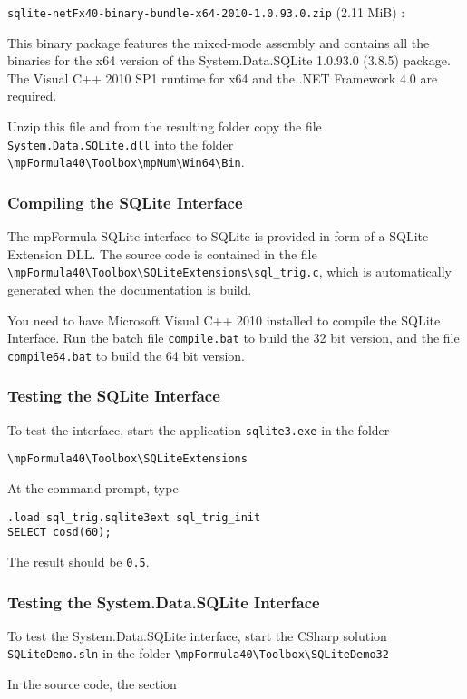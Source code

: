 \vpara
\verb|sqlite-netFx40-binary-bundle-x64-2010-1.0.93.0.zip| (2.11 MiB) : 

\vpara
This binary package features the mixed-mode assembly and contains all the binaries for the x64 version of the System.Data.SQLite 1.0.93.0 (3.8.5) package. The Visual C++ 2010 SP1 runtime for x64 and the .NET Framework 4.0 are required.

\vpara
Unzip this file and from the resulting folder copy the file \verb|System.Data.SQLite.dll|  into the folder \verb|\mpFormula40\Toolbox\mpNum\Win64\Bin|. 


\subsubsection{Compiling the SQLite Interface}

The mpFormula SQLite interface to SQLite is provided in form of a SQLite Extension DLL. The source code is contained in the file \verb|\mpFormula40\Toolbox\SQLiteExtensions\sql_trig.c|, which is automatically generated when the documentation is build.

You need to have Microsoft Visual C++ 2010 installed to compile the SQLite Interface. Run the batch file \verb|compile.bat| to build the 32 bit version, and the file  \verb|compile64.bat| to build the 64 bit version.


\subsubsection{Testing the SQLite Interface}

To test the interface, start the application \verb|sqlite3.exe| in the folder

\verb|\mpFormula40\Toolbox\SQLiteExtensions|

\vpara
At the command prompt, type
\begin{verbatim}
.load sql_trig.sqlite3ext sql_trig_init
SELECT cosd(60);
\end{verbatim}
The result should be \verb|0.5|.


\subsubsection{Testing the System.Data.SQLite Interface}

To test the System.Data.SQLite interface, start the CSharp solution \verb|SQLiteDemo.sln| in the folder 
\verb|\mpFormula40\Toolbox\SQLiteDemo32|

\vpara
In the source code, the section 

